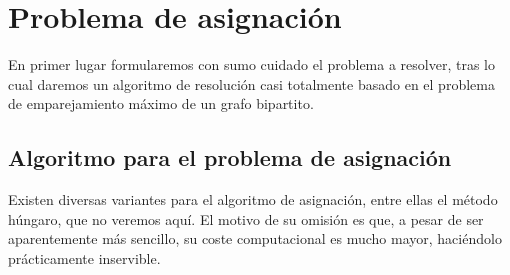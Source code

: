 \section{Problema de asignación}
En primer lugar formularemos con sumo cuidado el problema a resolver, tras lo cual daremos un algoritmo de resolución casi totalmente basado en el problema de emparejamiento máximo de un grafo bipartito.
\subsection{Algoritmo para el problema de asignación}
\begin{obs}
	Existen diversas variantes para el algoritmo de asignación, entre ellas el método húngaro, que no veremos aquí. El motivo de su omisión es que, a pesar de ser aparentemente más sencillo, su coste computacional es mucho mayor, haciéndolo prácticamente inservible.
\end{obs}
